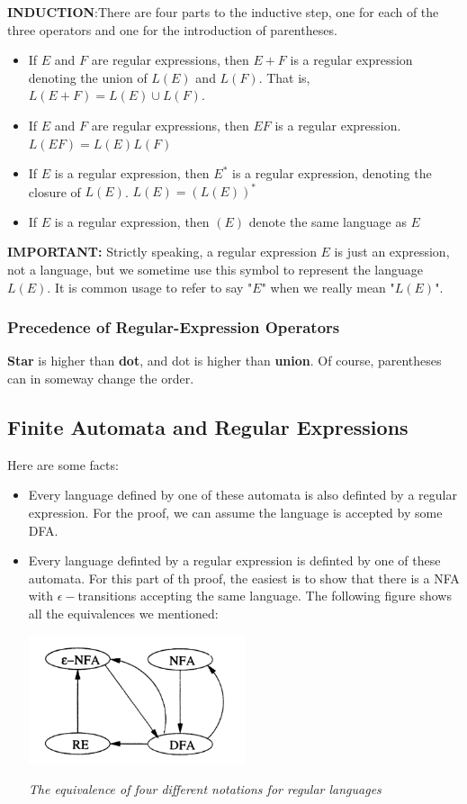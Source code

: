 \documentclass[12pt,reqno]{amsart}
\begin{document}
\textbf{INDUCTION}:There are four parts to the inductive step, one for each of the three operators and one for the introduction of parentheses.
\begin{itemize}
	\item If $E$ and $F$ are regular expressions, then $E+F$ is a regular expression denoting the union of $L(E)$ and $L(F)$. That is, $L(E+F)=L(E)\cup L(F)$.
	\item If $E$ and $F$ are regular expressions, then $EF$ is a regular expression. $L(EF) = L(E)L(F)$
	\item If $E$ is a regular expression, then $E^*$ is a regular expression, denoting the closure of $L(E)$. $L(E) = (L(E))^*$
	\item If $E$ is a regular expression, then $(E)$ denote the same language as $E$
\end{itemize}
\textbf{IMPORTANT:} Strictly speaking, a regular expression $E$ is just an expression, not a language, but we sometime use this symbol to represent the language $L(E)$. It is common usage to refer to say "$E$" when we really mean "$L(E)$".	 

\subsubsection{Precedence of Regular-Expression Operators}
\textbf{Star} is higher than \textbf{dot}, and dot is higher than \textbf{union}. Of course, parentheses can in someway change the order.

\subsection{Finite Automata and Regular Expressions}
Here are some facts:
\begin{itemize}
	\item Every language defined by one of these automata is also definted by a regular expression. For the proof, we can assume the language is accepted by some DFA.
	\item Every language definted by a regular expression is definted by one of these automata. For this part of th proof, the easiest is to show that there is a NFA with $\epsilon-$transitions accepting the same language. The following figure shows all the equivalences we mentioned:
	
\begin{center}
	\includegraphics[width=0.5\textwidth]{equal}
		
	\textit{The equivalence of four different notations for regular languages}
\end{center}
	
\end{itemize}
\end{document}
